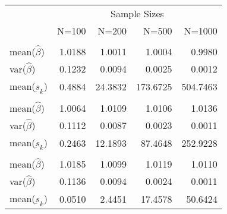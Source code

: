 
\begin{tabular}{lrrrr}
\toprule
\multicolumn{1}{c}{ } & \multicolumn{4}{c}{Sample Sizes} \\
\cmidrule(l{3pt}r{3pt}){2-5}
  & N=100 & N=200 & N=500 & N=1000\\
\midrule
\addlinespace[0.3em]
\multicolumn{5}{l}{\textbf{$ \rho = 0 $  }}\\
\hspace{1em}mean($\hat{\beta}$) & 1.0188 & 1.0011 & 1.0004 & 0.9980\\
\hspace{1em}var($\hat{\beta}$) & 0.1232 & 0.0094 & 0.0025 & 0.0012\\
\hspace{1em}mean($\underbar{s}_k$) & 0.4884 & 24.3832 & 173.6725 & 504.7463\\
\addlinespace[0.3em]
\multicolumn{5}{l}{\textbf{$ \rho = 0.5 $}}\\
\hspace{1em}mean($\hat{\beta}$) & 1.0064 & 1.0109 & 1.0106 & 1.0136\\
\hspace{1em}var($\hat{\beta}$) & 0.1112 & 0.0087 & 0.0023 & 0.0011\\
\hspace{1em}mean($\underbar{s}_k$) & 0.2463 & 12.1893 & 87.4648 & 252.9228\\
\addlinespace[0.3em]
\multicolumn{5}{l}{\textbf{$ \rho = 0.9 $}}\\
\hspace{1em}mean($\hat{\beta}$) & 1.0185 & 1.0099 & 1.0119 & 1.0110\\
\hspace{1em}var($\hat{\beta}$) & 0.1136 & 0.0094 & 0.0024 & 0.0011\\
\hspace{1em}mean($\underbar{s}_k$) & 0.0510 & 2.4451 & 17.4578 & 50.6424\\
\bottomrule
\end{tabular}

